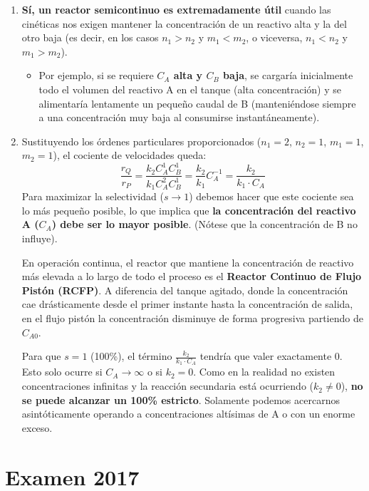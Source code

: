 \begin{enumerate}[label=\alph*)]
	\item \textbf{Sí, un reactor semicontinuo es extremadamente útil} cuando las cinéticas nos exigen mantener la concentración de un reactivo alta y la del otro baja (es decir, en los casos $n_1 > n_2$ y $m_1 < m_2$, o viceversa, $n_1 < n_2$ y $m_1 > m_2$).
	      \begin{itemize}
		      \item Por ejemplo, si se requiere \textbf{$C_A$ alta y $C_B$ baja}, se cargaría inicialmente todo el volumen del reactivo A en el tanque (alta concentración) y se alimentaría lentamente un pequeño caudal de B (manteniéndose siempre a una concentración muy baja al consumirse instantáneamente).
	      \end{itemize}

	\item Sustituyendo los órdenes particulares proporcionados ($n_1 = 2$, $n_2 = 1$, $m_1 = 1$, $m_2 = 1$), el cociente de velocidades queda:
	      \begin{equation*}
		      \frac{r_Q}{r_P} = \frac{k_2 C_A^1 C_B^1}{k_1 C_A^2 C_B^1} = \frac{k_2}{k_1} C_A^{-1} = \frac{k_2}{k_1 \cdot C_A}
	      \end{equation*}
	      Para maximizar la selectividad ($s \rightarrow 1$) debemos hacer que este cociente sea lo más pequeño posible, lo que implica que \textbf{la concentración del reactivo A ($C_A$) debe ser lo mayor posible}. (Nótese que la concentración de B no influye).

	      En operación continua, el reactor que mantiene la concentración de reactivo más elevada a lo largo de todo el proceso es el \textbf{Reactor Continuo de Flujo Pistón (RCFP)}. A diferencia del tanque agitado, donde la concentración cae drásticamente desde el primer instante hasta la concentración de salida, en el flujo pistón la concentración disminuye de forma progresiva partiendo de $C_{A0}$.

	      Para que $s = 1$ (100\%), el término $\frac{k_2}{k_1 \cdot C_A}$ tendría que valer exactamente 0. Esto solo ocurre si $C_A \rightarrow \infty$ o si $k_2 = 0$. Como en la realidad no existen concentraciones infinitas y la reacción secundaria está ocurriendo ($k_2 \neq 0$), \textbf{no se puede alcanzar un 100\% estricto}. Solamente podemos acercarnos asintóticamente operando a concentraciones altísimas de A o con un enorme exceso.
\end{enumerate}

\newpage
\section{Examen 2017}

